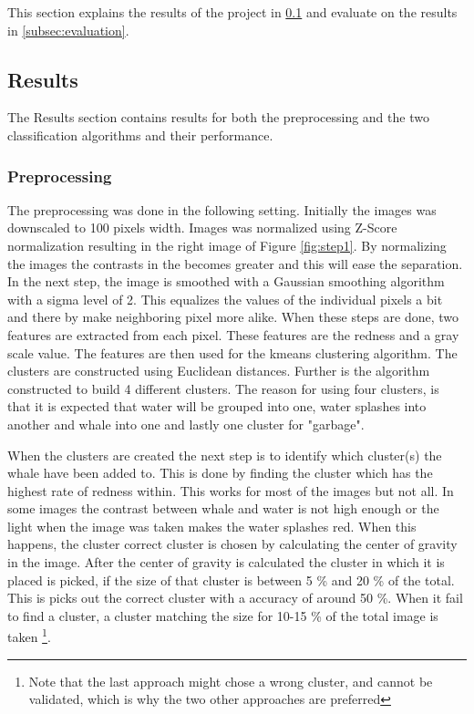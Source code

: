 This section explains the results of the project in \ref{subsec:results} and evaluate on the results in \ref{subsec:evaluation}.

\subsection{Results}
\label{subsec:results}
The Results section contains results for both the preprocessing and the two classification algorithms and their performance.


\subsubsection{Preprocessing}
The preprocessing was done in the following setting.
Initially the images was downscaled to 100 pixels width.
Images was normalized using Z-Score normalization resulting in the right image of Figure \ref{fig:step1}. By normalizing the images the contrasts in the becomes greater and this will ease the separation.
In the next step, the image is smoothed with a Gaussian smoothing algorithm with a sigma level of 2. This equalizes the values of the individual pixels a bit and there by make neighboring pixel more alike.
When these steps are done, two features are extracted from each pixel.
These features are the redness and a gray scale value.
The features are then used for the kmeans clustering algorithm.
The clusters are constructed using Euclidean distances. Further is the algorithm constructed to build 4 different clusters.
The reason for using four clusters, is that it is expected that water will be grouped into one, water splashes into another and whale into one and lastly one cluster for "garbage". 

When the clusters are created the next step  is to identify which cluster(s) the whale have been added to.
This is done by finding the cluster which has the highest rate of redness within. This works for most of the images but not all. In some images the contrast between whale and water is not high enough or the light when the image was taken makes the water splashes red. When this happens, the cluster correct cluster is chosen by calculating the center of gravity in the image. After the center of gravity is calculated the cluster in which it is placed is picked, if the size of that cluster is between 5 \% and 20 \% of the total. This is picks out the correct cluster with a accuracy of around 50 \%.
When it fail to find a cluster, a cluster matching the size for 10-15 \% of the total image is taken \footnote{Note that the last approach might chose a wrong cluster, and cannot be validated, which is why the two other approaches are preferred}. 

